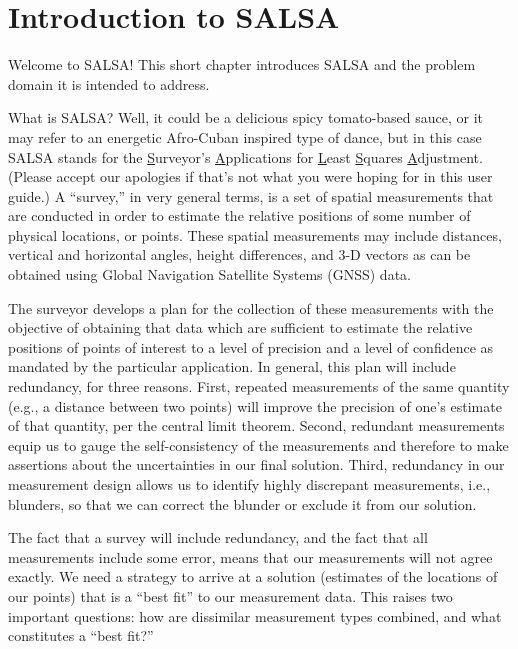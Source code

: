 \chapter{Introduction to SALSA}
\label{chap:Introduction}

Welcome to SALSA!  This short chapter introduces SALSA and the problem domain it is intended to address.

What is SALSA?  Well, it could be a delicious spicy tomato-based sauce, or it may refer to an energetic Afro-Cuban inspired type of dance, but in this case SALSA stands for the \underline{S}urveyor's \underline{A}pplications for \underline{L}east \underline{S}quares \underline{A}djustment.  (Please accept our apologies if that's not what you were hoping for in this user guide.)  A ``survey,'' in very general terms, is a set of spatial measurements that are conducted in order to estimate the relative positions of some number of physical locations, or points.  These spatial measurements may include distances, vertical and horizontal angles, height differences, and 3-D vectors as can be obtained using Global Navigation Satellite Systems (GNSS) data.

The surveyor develops a plan for the collection of these measurements with the objective of obtaining that data which are sufficient to estimate the relative positions of points of interest to a level of precision and a level of confidence as mandated by the particular application.  In general, this plan will include redundancy, for three reasons.  First, repeated measurements of the same quantity (e.g., a distance between two points) will improve the precision of one's estimate of that quantity, per the central limit theorem.  Second, redundant measurements equip us to gauge the self-consistency of the measurements and therefore to make assertions about the uncertainties in our final solution.  Third, redundancy in our measurement design allows us to identify highly discrepant measurements, i.e., blunders, so that we can correct the blunder or exclude it from our solution.

The fact that a survey will include redundancy, and the fact that all measurements include some error, means that our measurements will not agree exactly.  We need a strategy to arrive at a solution (estimates of the locations of our points) that is a ``best fit'' to our measurement data.  This raises two important questions: how are dissimilar measurement types combined, and what constitutes a ``best fit?''

